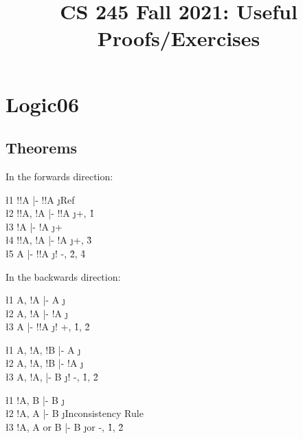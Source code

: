 \documentclass[class=cs245,notes,leqno]{agony}
\title{CS 245 Fall 2021: Useful Proofs/Exercises}
\begin{document}
\thispagestyle{firstpage}
\renewcommand{\contentsname}{CS 245 Fall 2021:\\{\huge Useful Proofs/Exercises}}
\tableofcontents

\chapter{Logic06}
\section{Theorems}
\begin{theorem}
\end{theorem}
\begin{prf}
  In the forwards direction:
  \begin{deduce}
    \l1 !!A     |- !!A \j {Ref}           \\
    \l2 !!A, !A |- !!A \j {+, \r1}        \\
    \l3 !A      |- !A  \j {+}             \\
    \l4 !!A, !A |- !A  \j {+, \r3}        \\
    \l5 A       |- !!A \j {! -, \r2, \r4}
  \end{deduce}
  In the backwards direction:
  \begin{deduce}
    \l1 A, !A |- A   \j {\E}            \\
    \l2 A, !A |- !A  \j {\E}            \\
    \l3 A     |- !!A \j {! +, \r1, \r2}
  \end{deduce}
\end{prf}

\begin{theorem}
\end{theorem}
\begin{prf}
  \begin{deduce}
    \l1 A, !A, !B |- A  \j {\E}            \\
    \l2 A, !A, !B |- !A \j {\E}            \\
    \l3 A, !A,    |- B  \j {! -, \r1, \r2}
  \end{deduce}
\end{prf}

\begin{theorem}
\end{theorem}
\begin{prf}
  \begin{deduce}
    \l1 !A, B      |- B \j {\E}                 \\
    \l2 !A, A      |- B \j {Inconsistency Rule} \\
    \l3 !A, A or B |- B \j {or -, \r1, \r2}
  \end{deduce}
\end{prf}
\end{document}
